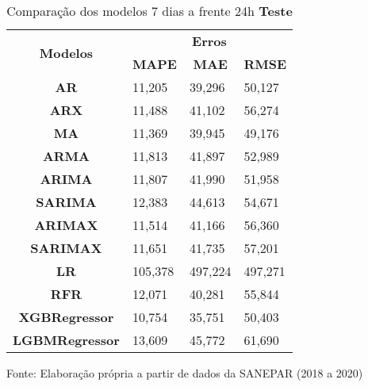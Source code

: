 \begin{table}[H]
	\centering
	\caption{Comparação dos modelos 7 dias a frente 24h \textbf{Teste} }\label{tb:10-24tst}
	\begin{tabular}{@{}clll@{}}
		\toprule
		\multirow{2}{*}{\textbf{Modelos}} & \multicolumn{3}{c}{\textbf{Erros}}                                                                       \\ \cmidrule(l){2-4} 
		& \multicolumn{1}{c}{\textbf{MAPE}} & \multicolumn{1}{c}{\textbf{MAE}} & \multicolumn{1}{c}{\textbf{RMSE}} \\ \hline
\textbf{AR}                       & 11,205                            & 39,296                           & 50,127                            \\
\textbf{ARX}                      & 11,488                            & 41,102                           & 56,274                            \\
\textbf{MA}                       & 11,369                            & 39,945                           & 49,176                            \\
\textbf{ARMA}                     & 11,813                            & 41,897                           & 52,989                            \\
\textbf{ARIMA}                    & 11,807                            & 41,990                           & 51,958                            \\
\textbf{SARIMA}                   & 12,383                            & 44,613                           & 54,671                            \\
\textbf{ARIMAX}                   & 11,514                            & 41,166                           & 56,360                            \\
\textbf{SARIMAX}                  & 11,651                            & 41,735                           & 57,201                            \\
\textbf{LR}        & 105,378                           & 497,224                          & 497,271                           \\
\textbf{RFR}  & 12,071                            & 40,281                           & 55,844                            \\
\textbf{XGBRegressor}             & 10,754                            & 35,751                           & 50,403                            \\
\textbf{LGBMRegressor}            & 13,609                            & 45,772                           & 61,690                            \\ \bottomrule
	\end{tabular}

Fonte: Elaboração própria a partir de dados da SANEPAR (2018 a 2020)
\end{table}

